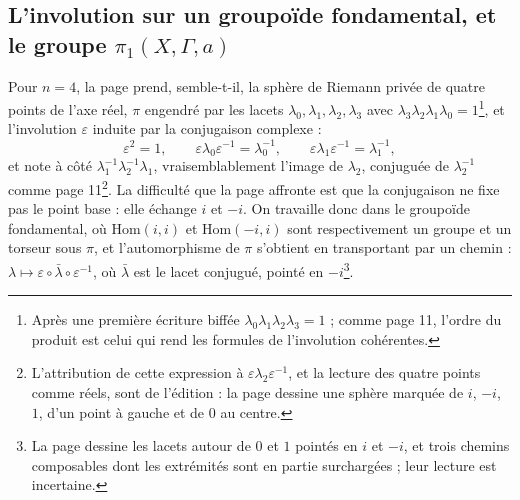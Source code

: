 \documentclass[11pt,a4paper]{article}
\begin{document}
\subsection*{L'involution sur un groupoïde fondamental, et le groupe $\pi_1(X, \Gamma, a)$}

Pour $n = 4$, la page prend, semble-t-il, la sphère de Riemann privée de
quatre points de l'axe réel, $\pi$ engendré par les lacets $\lambda_0, \lambda_1, \lambda_2, \lambda_3$ avec
$\lambda_3\lambda_2\lambda_1\lambda_0 = 1$\footnote{Après une première écriture biffée
$\lambda_0\lambda_1\lambda_2\lambda_3 = 1$ ; comme page 11, l'ordre du produit
est celui qui rend les formules de l'involution cohérentes.}, et
l'involution $\varepsilon$ induite par la conjugaison complexe :
\[
\varepsilon^2 = 1, \qquad \varepsilon\lambda_0\varepsilon^{-1} = \lambda_0^{-1}, \qquad
\varepsilon\lambda_1\varepsilon^{-1} = \lambda_1^{-1},
\]
et note à côté $\lambda_1^{-1}\lambda_2^{-1}\lambda_1$, vraisemblablement l'image de
$\lambda_2$, conjuguée de $\lambda_2^{-1}$ comme page 11\footnote{L'attribution de
cette expression à $\varepsilon\lambda_2\varepsilon^{-1}$, et la lecture des
quatre points comme réels, sont de l'édition : la page dessine une sphère
marquée de $i$, $-i$, $1$, d'un point à gauche et de $0$ au centre.}.
La difficulté que la page affronte est que la conjugaison ne fixe pas le point
base : elle échange $i$ et $-i$. On travaille donc dans le groupoïde
fondamental, où $\mathrm{Hom}(i, i)$ et $\mathrm{Hom}(-i, i)$ sont respectivement un
groupe et un torseur sous $\pi$, et l'automorphisme de $\pi$ s'obtient en
transportant par un chemin : $\lambda \mapsto \varepsilon \circ \bar\lambda \circ \varepsilon^{-1}$,
où $\bar\lambda$ est le lacet conjugué, pointé en $-i$\footnote{La page dessine les
lacets autour de $0$ et $1$ pointés en $i$ et $-i$, et trois chemins composables
dont les extrémités sont en partie surchargées ; leur lecture est
incertaine.}.
\end{document}
